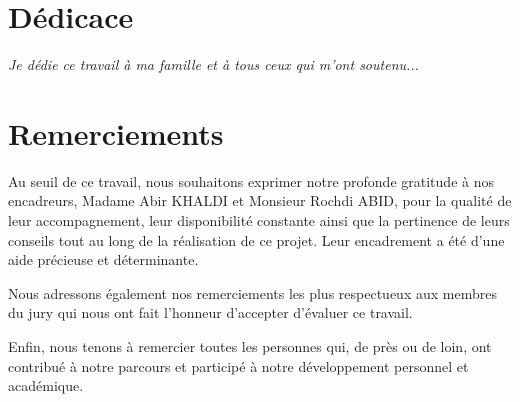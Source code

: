 \documentclass[12pt,a4paper]{report}
\begin{document}
\chapter*{Dédicace}
\textit{Je dédie ce travail à ma famille et à tous ceux qui m'ont soutenu...}

\chapter*{Remerciements}

\begin{itshape}
Au seuil de ce travail, nous souhaitons exprimer notre profonde gratitude à nos encadreurs,
Madame Abir KHALDI et Monsieur Rochdi ABID, pour la qualité de leur accompagnement, leur disponibilité
constante ainsi que la pertinence de leurs conseils tout au long de la réalisation de ce projet.
Leur encadrement a été d'une aide précieuse et déterminante.

Nous adressons également nos remerciements les plus respectueux aux membres du jury qui nous ont
fait l'honneur d'accepter d'évaluer ce travail.

Enfin, nous tenons à remercier toutes les personnes qui, de près ou de loin, ont contribué à notre
parcours et participé à notre développement personnel et académique.
\end{itshape}

\tableofcontents
{}
\newpage

\listoffigures
{}
\newpage

\listoftables
{}
\newpage

\end{document}
